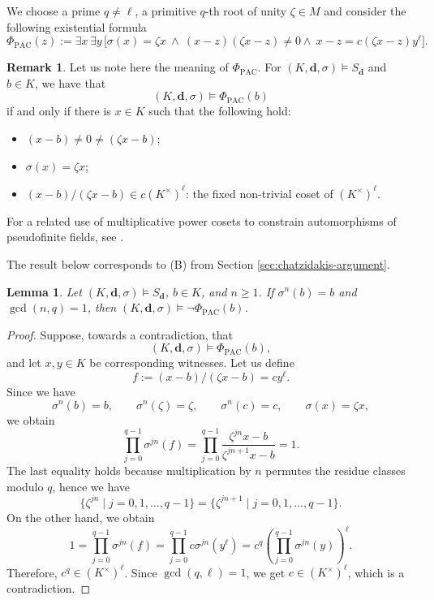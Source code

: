 \documentclass[10pt,a4paper]{amsart}
\renewcommand{\ge}{\geqslant}
\newtheorem{lemma}[theorem]{Lemma}
\theoremstyle{definition}
\newtheorem{remark}[theorem]{Remark}
\newcommand{\bd}{\boldsymbol d}
\begin{document}
We choose a prime $q\ne\ell$, a primitive $q$-th root of unity
$\zeta\in M$ and consider the following existential formula
\[
\Phi_{\mathrm{PAC}}(z):=\exists x\,\exists y\,\bigl[
\sigma(x)=\zeta x
\ \land\ (x-z)(\zeta x-z)\ne0
\land\ x-z=c(\zeta x-z)y^\ell
\bigr].
\]
\begin{remark}\label{meaning}
Let us note here the meaning of $\Phi_{\mathrm{PAC}}$. For $(K,\bd,\sigma)\models S_{\bd}$ and $b\in K$, we have that
\[
(K,\bd,\sigma)\models \Phi_{\mathrm{PAC}}(b)
\]
if and only if there is $x\in K$ such that the following hold:
\begin{itemize}
  \item $(x-b)\neq 0\neq (\zeta x-b)$;

  \item $\sigma(x)=\zeta x$;

  \item $(x-b)/(\zeta x-b)\in c(K^\times)^\ell$: the fixed non-trivial coset of $(K^\times)^\ell$.
\end{itemize}
\end{remark}
For a related use of multiplicative power cosets to constrain
automorphisms of pseudofinite fields, see
\cite[Section~4]{BHAlgClosure}.

The result below corresponds to (B) from Section \ref{sec:chatzidakis-argument}.
\begin{lemma}\label{b:lem:period}
Let $(K,\bd,\sigma)\models S_{\bd}$, $b\in K$,
and $n\ge1$. If $\sigma^n(b)=b$
and $\gcd(n,q)=1$, then
$(K,\bd,\sigma)\models\neg\Phi_{\mathrm{PAC}}(b)$.
\end{lemma}

\begin{proof}Suppose, towards a contradiction, that
\[
(K,\bd,\sigma)\models\Phi_{\mathrm{PAC}}(b),
\]
and let $x,y\in K$ be corresponding witnesses. Let us define
\[
f:=(x-b)/(\zeta x-b)=cy^\ell.
\]
Since we have
\[
\sigma^n(b)=b,\qquad \sigma^n(\zeta)=\zeta,\qquad \sigma^n(c)=c,\qquad \sigma(x)=\zeta x,
\]
we obtain
\[
\prod_{j=0}^{q-1}\sigma^{jn}(f)
=\prod_{j=0}^{q-1}
  \frac{\zeta^{jn}x-b}{\zeta^{jn+1}x-b}
=1.
\]
The last equality holds because multiplication by $n$ permutes the
residue classes modulo $q$, hence we have
\[
\{\zeta^{jn}\mid j=0,1,\ldots,q-1\}=\{\zeta^{jn+1}\mid j=0,1,\ldots,q-1\}.
\]
On the other hand, we obtain
\[
1=\prod_{j=0}^{q-1}\sigma^{jn}(f)
=\prod_{j=0}^{q-1}c\sigma^{jn}\left(y^\ell\right)
=c^q\left(\prod_{j=0}^{q-1}\sigma^{jn}(y)\right)^\ell.
\]
Therefore, $c^q\in (K^\times)^\ell$. Since $\gcd(q,\ell)=1$, we get $c\in (K^\times)^\ell$, which is a contradiction.
\end{proof}
\end{document}
